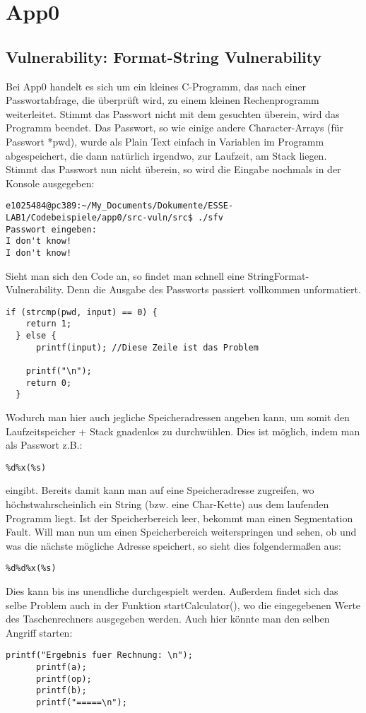 \section{App0}
\subsection{Vulnerability: Format-String Vulnerability}
Bei App0 handelt es sich um ein kleines C-Programm, das nach einer Passwortabfrage, die überprüft wird, zu einem kleinen Rechenprogramm weiterleitet. Stimmt das Passwort nicht mit dem gesuchten überein, wird das Programm beendet. Das Passwort, so wie einige andere Character-Arrays (für Passwort *pwd), wurde als Plain Text einfach in Variablen im Programm abgespeichert, die dann natürlich irgendwo, zur Laufzeit, am Stack liegen.\linebreak
Stimmt das Passwort nun nicht überein, so wird die Eingabe nochmals in der Konsole ausgegeben:
\begin{lstlisting}
e1025484@pc389:~/My_Documents/Dokumente/ESSE-LAB1/Codebeispiele/app0/src-vuln/src$ ./sfv
Passwort eingeben: 
I don't know!
I don't know!

\end{lstlisting}
Sieht man sich den Code an, so findet man schnell eine StringFormat-Vulnerability. Denn die Ausgabe des Passworts passiert vollkommen unformatiert.
\begin{lstlisting}
if (strcmp(pwd, input) == 0) {
    return 1;
  } else {
      printf(input); //Diese Zeile ist das Problem
    
    printf("\n");
    return 0;
  }
\end{lstlisting}
Wodurch man hier auch jegliche Speicheradressen angeben kann, um somit den Laufzeitspeicher + Stack gnadenlos zu durchwühlen. Dies ist möglich, indem man
als Passwort z.B.:
\begin{lstlisting}
%d%x(%s)
\end{lstlisting}
eingibt. Bereits damit kann man auf eine Speicheradresse zugreifen, wo höchstwahrscheinlich ein String (bzw. eine Char-Kette) aus dem laufenden Programm liegt.
Ist der Speicherbereich leer, bekommt man einen Segmentation Fault. Will man nun um einen Speicherbereich weiterspringen
und sehen, ob und was die nächste mögliche Adresse speichert, so sieht dies folgendermaßen aus:
\begin{lstlisting}
%d%d%x(%s)
\end{lstlisting}
Dies kann bis ins unendliche durchgespielt werden. Außerdem findet sich das selbe Problem auch in der Funktion startCalculator(),
wo die eingegebenen Werte des Taschenrechners ausgegeben werden. Auch hier könnte man den selben Angriff starten:
\begin{lstlisting}
printf("Ergebnis fuer Rechnung: \n");
      printf(a);
      printf(op);
      printf(b);
      printf("=====\n");
\end{lstlisting}
